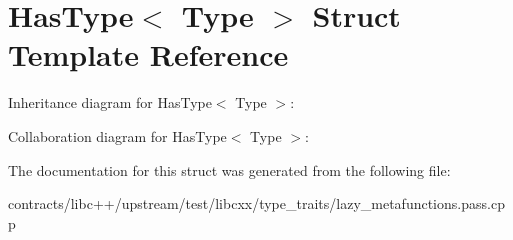\hypertarget{struct_has_type}{}\section{Has\+Type$<$ Type $>$ Struct Template Reference}
\label{struct_has_type}


Inheritance diagram for Has\+Type$<$ Type $>$\+:


Collaboration diagram for Has\+Type$<$ Type $>$\+:


The documentation for this struct was generated from the following file\+:\begin{DoxyCompactItemize}
\item 
contracts/libc++/upstream/test/libcxx/type\+\_\+traits/lazy\+\_\+metafunctions.\+pass.\+cpp\end{DoxyCompactItemize}
